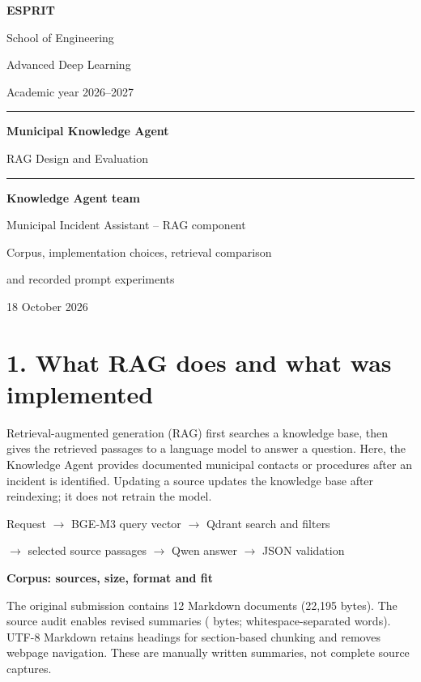 \documentclass[10pt,a4paper]{article}
\newcommand{\heading}[1]{\section*{\large\color{ink}#1}}
\newcommand{\subheading}[1]{\par\smallskip\textbf{#1}\par}
\begin{document}
\begin{titlepage}
\centering
{\Large\textbf{ESPRIT}}\par
\vspace{5mm}
{\large School of Engineering}\par
\vspace{4mm}
Advanced Deep Learning\par
Academic year 2026--2027\par
\vspace{35mm}
{\color{ink}\rule{\linewidth}{0.8pt}}\par
\vspace{6mm}
{\Huge\bfseries Municipal Knowledge Agent}\par
\vspace{5mm}
{\Large RAG Design and Evaluation}\par
\vspace{6mm}
{\color{ink}\rule{\linewidth}{0.8pt}}\par
\vspace{17mm}
{\large\textbf{Knowledge Agent team}}\par
\vspace{4mm}
Municipal Incident Assistant -- RAG component\par
\vfill
Corpus, implementation choices, retrieval comparison\par
and recorded prompt experiments\par
\vspace{8mm}
18 October 2026
\end{titlepage}
\setcounter{page}{2}

\heading{1. What RAG does and what was implemented}
Retrieval-augmented generation (RAG) first searches a knowledge base, then gives the
retrieved passages to a language model to answer a question. Here, the Knowledge Agent
provides documented municipal contacts or procedures after an incident is identified.
Updating a source updates the knowledge base after reindexing; it does not retrain the model.

\begin{center}\small
Request $\rightarrow$ BGE-M3 query vector $\rightarrow$ Qdrant search and filters\par
$\rightarrow$ selected source passages $\rightarrow$ Qwen answer $\rightarrow$ JSON validation
\end{center}

\subheading{Corpus: sources, size, format and fit}
The original submission contains 12 Markdown documents (22,195 bytes). The source audit
enables \activecount{} revised summaries (\activebytes{} bytes; \activewords{}
whitespace-separated words). UTF-8 Markdown retains headings for section-based chunking
and removes webpage navigation. These are manually written summaries, not complete source captures.
\end{document}
